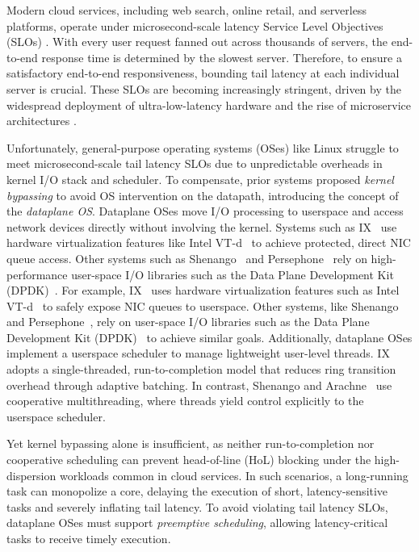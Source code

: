 Modern cloud services, including web search, online retail, and serverless platforms, operate under microsecond-scale latency Service Level Objectives (SLOs) \cite{barroso2017attack,kaffes2019shinjuku,marty2019snap,zhang2021demikernel,iyer2023achieving}.
With every user request fanned out across thousands of servers, the end-to-end response time is determined by the slowest server.
Therefore, to ensure a satisfactory end-to-end responsiveness, bounding tail latency at each individual server is crucial.
These SLOs are becoming increasingly stringent, driven by the widespread deployment of ultra-low-latency hardware  and the rise of microservice architectures .

Unfortunately, general-purpose operating systems (OSes) like Linux struggle to meet microsecond-scale tail latency SLOs due to unpredictable overheads in kernel I/O stack and scheduler.
To compensate, prior systems proposed \textit{kernel bypassing} to avoid OS intervention on the datapath, introducing the concept of the \textit{dataplane OS}.
Dataplane OSes move I/O processing to userspace and access network devices directly without involving the kernel.
Systems such as IX~\cite{belay2014ix} use hardware virtualization features like Intel VT-d~\cite{} to achieve protected, direct NIC queue access.
Other systems such as Shenango~\cite{} and Persephone~\cite{} rely on high-performance user-space I/O libraries such as the Data Plane Development Kit (DPDK)~\cite{}.
For example, IX~\cite{belay2014ix} uses hardware virtualization features such as Intel VT-d~\cite{} to safely expose NIC queues to userspace.
Other systems, like Shenango~\cite{} and Persephone~\cite{}, rely on user-space I/O libraries such as the Data Plane Development Kit (DPDK)~\cite{} to achieve similar goals.
Additionally, dataplane OSes implement a userspace scheduler to manage lightweight user-level threads.
IX adopts a single-threaded, run-to-completion model that reduces ring transition overhead through adaptive batching.
In contrast, Shenango and Arachne~\cite{} use cooperative multithreading, where threads yield control explicitly to the userspace scheduler.

Yet kernel bypassing alone is insufficient, as neither run-to-completion nor cooperative scheduling can prevent head-of-line (HoL) blocking under the high-dispersion workloads common in cloud services.
In such scenarios, a long-running task can monopolize a core, delaying the execution of short, latency-sensitive tasks and severely inflating tail latency.
To avoid violating tail latency SLOs, dataplane OSes must support \textit{preemptive scheduling}, allowing latency-critical tasks to receive timely execution.

